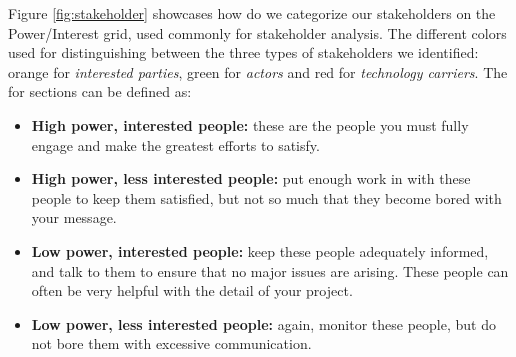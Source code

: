 Figure \ref{fig:stakeholder} showcases how do we categorize our stakeholders on the Power/Interest grid, used commonly for stakeholder analysis.
The different colors used for distinguishing between the three types of stakeholders we identified: orange for \textit{interested parties}, green for \textit{actors} and red for \textit{technology carriers}.
The for sections can be defined as:
\begin{itemize}
	\item \textbf{High power, interested people:} these are the people you must fully engage and make the greatest efforts to satisfy.
	\item \textbf{High power, less interested people:} put enough work in with these people to keep them satisfied, but not so much that they become bored with your message.
	\item \textbf{Low power, interested people:} keep these people adequately informed, and talk to them to ensure that no major issues are arising. These people can often be very helpful with the detail of your project.
	\item \textbf{Low power, less interested people:} again, monitor these people, but do not bore them with excessive communication.
\end{itemize}